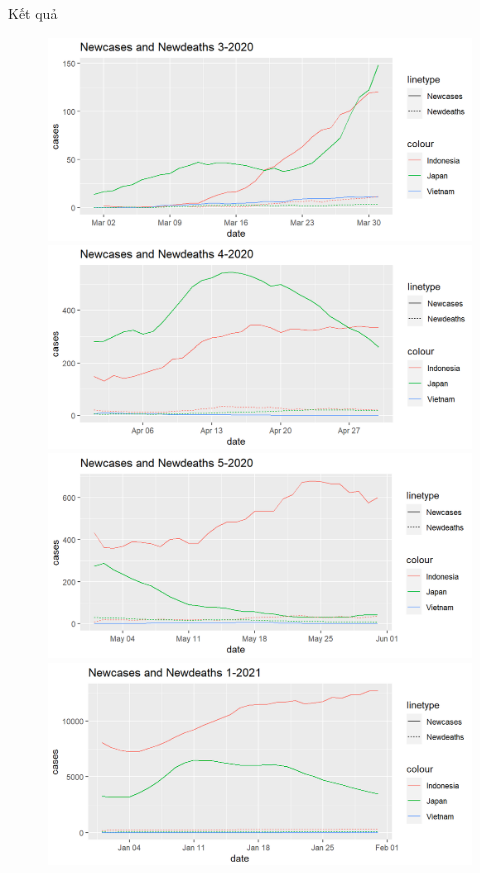 \documentclass[a4paper]{article}
\theoremstyle{definition}
\begin{document}
\begin{enumerate}[1)]
	Kết quả
	\begin{figure}[H]
	    \begin{center}
            \includegraphics[scale=0.5]{vi/new_3_2020}
            \includegraphics[scale=0.5]{vi/new_4_2020}
			\includegraphics[scale=0.5]{vi/new_5_2020}
			\includegraphics[scale=0.5]{vi/new_1_2021}

\end{center}
\end{figure}
\end{enumerate}
\end{document}
